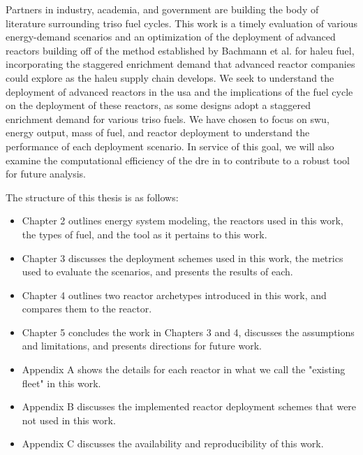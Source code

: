Partners in industry, academia, and government are building the body of
literature surrounding \gls{triso} fuel cycles. This work is a timely
evaluation of various energy-demand scenarios and an optimization of the
deployment of advanced reactors building off of the method established by
Bachmann et al. \cite{bachmann_enrichment_2021} for \gls{haleu} fuel,
incorporating the staggered enrichment demand that advanced reactor
companies could explore as the \gls{haleu} supply chain
develops. We seek to understand the deployment of advanced reactors in the
\gls{usa} and the implications of the fuel cycle on the deployment of these
reactors, as some designs adopt a staggered enrichment demand for various
\gls{triso} fuels. We have chosen to focus on \gls{swu},
energy output, mass of fuel, and reactor deployment to understand
the performance of each deployment scenario. In
service of this goal, we will also examine the computational efficiency of the
\gls{dre} in \cyclus to contribute to a robust tool for future analysis.


The structure of this thesis is as follows:

\begin{itemize}
    \item Chapter 2 outlines energy system modeling, the reactors used in this work, the types of fuel, and the \cyclus tool as it pertains to this work.
    \item Chapter 3 discusses the deployment schemes used in this work, the metrics used to evaluate the scenarios, and presents the results of each.
    \item Chapter 4 outlines two reactor archetypes introduced in this work, and compares them to the \cycamore reactor.
    \item Chapter 5 concludes the work in Chapters 3 and 4, discusses the assumptions and limitations, and presents directions for future work.
    \item Appendix A shows the details for each reactor in what we call the "existing fleet" in this work.
    \item Appendix B discusses the implemented reactor deployment schemes that were not used in this work.
    \item Appendix C discusses the availability and reproducibility of this work.
\end{itemize}
